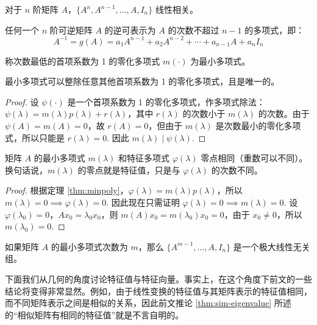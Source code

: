 \begin{corollary}
对于 $n$ 阶矩阵 $A$，$\{A^n,A^{n-1},\ldots,A,I_n\}$ 线性相关。
\end{corollary}

\begin{corollary}
\label{cor:invpoly}
任何一个 $n$ 阶可逆矩阵 $A$ 的逆可表示为 $A$ 的次数不超过 $n-1$ 的多项式，即：
\[
    A^{-1}=g(A)=a_1A^{n-1}+a_2A^{n-2}+\cdots+a_{n-1}A+a_nI_n
\]
\end{corollary}

\begin{definition}[最小多项式]
称次数最低的首项系数为 1 的零化多项式 $m(\cdot)$ 为最小多项式。
\end{definition}

\begin{theorem}
\label{thm:minpoly}
最小多项式可以整除任意其他首项系数为 1 的零化多项式，且是唯一的。
\end{theorem}
\begin{proof}
设 $\psi(\cdot)$ 是一个首项系数为 1 的零化多项式，作多项式除法：$\psi(\lambda)=m(\lambda)p(\lambda)+r(\lambda)$，其中 $r(\lambda)$ 的次数小于 $m(\lambda)$ 的次数。由于 $\psi(A)=m(A)=0$，故 $r(A)=0$，但由于 $m(\lambda)$ 是次数最小的零化多项式，所以只能是 $r(\lambda)=0$. 因此 $m(\lambda)\mid\psi(\lambda)$.
\end{proof}

\begin{theorem}
矩阵 $A$ 的最小多项式 $m(\lambda)$ 和特征多项式 $\varphi(\lambda)$ 零点相同（重数可以不同）。换句话说，$m(\lambda)$ 的零点就是特征值，只是与 $\varphi(\lambda)$ 的次数不同。
\end{theorem}
\begin{proof}
根据定理 \ref{thm:minpoly}，$\varphi(\lambda)=m(\lambda)p(\lambda)$，所以 $m(\lambda)=0\implies \varphi(\lambda)=0$. 因此现在只需证明 $\varphi(\lambda)=0\implies m(\lambda)=0$.
设 $\varphi(\lambda_0)=0$，$A x_0=\lambda_0 x_0$，则 $m(A) x_0=m(\lambda_0) x_0=0$，由于 $x_0\neq 0$，所以 $m(\lambda_0)=0$.
\end{proof}

\begin{com}
如果矩阵 $A$ 的最小多项式次数为 $m$，那么 $\{A^{m-1},\ldots,A,I_n\}$ 是一个极大线性无关组。
\end{com}

下面我们从几何的角度讨论特征值与特征向量。事实上，在这个角度下前文的一些结论将变得非常显然。例如，由于线性变换的特征值与其矩阵表示的特征值相同，而不同矩阵表示之间是相似的关系，因此前文推论 \ref{thm:sim-eigenvalue} 所述的“相似矩阵有相同的特征值”就是不言自明的。

